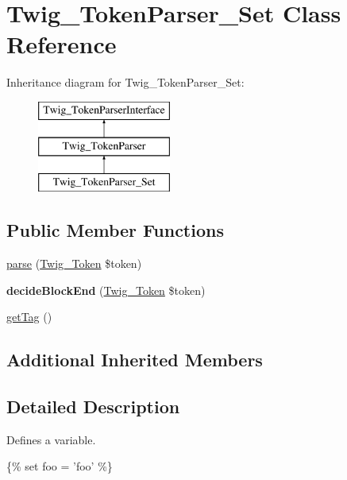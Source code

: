 \hypertarget{class_twig___token_parser___set}{}\section{Twig\+\_\+\+Token\+Parser\+\_\+\+Set Class Reference}
\label{class_twig___token_parser___set}
Inheritance diagram for Twig\+\_\+\+Token\+Parser\+\_\+\+Set\+:\begin{figure}[H]
\begin{center}
\leavevmode
\includegraphics[height=3.000000cm]{class_twig___token_parser___set}
\end{center}
\end{figure}
\subsection*{Public Member Functions}
\begin{DoxyCompactItemize}
\item 
\hyperlink{class_twig___token_parser___set_a5dfa2e269321584fb74e8b43dabe0efd}{parse} (\hyperlink{class_twig___token}{Twig\+\_\+\+Token} \$token)
\item 
\hypertarget{class_twig___token_parser___set_aa976dc013d35c2813752149bacd88902}{}{\bfseries decide\+Block\+End} (\hyperlink{class_twig___token}{Twig\+\_\+\+Token} \$token)\label{class_twig___token_parser___set_aa976dc013d35c2813752149bacd88902}

\item 
\hyperlink{class_twig___token_parser___set_ab86ba36154b20e6bbfa3ba705f12f9d6}{get\+Tag} ()
\end{DoxyCompactItemize}
\subsection*{Additional Inherited Members}


\subsection{Detailed Description}
Defines a variable.


\begin{DoxyPre}
 \{\% set foo = 'foo' \%\}\end{DoxyPre}



